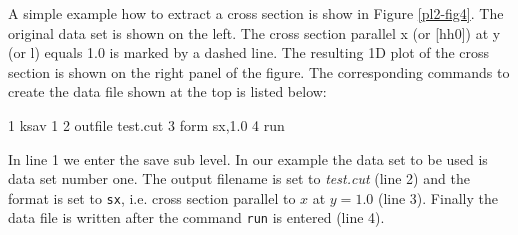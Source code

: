 A simple example how to extract a cross section is show in Figure
\ref{pl2-fig4}. The original data set is shown on the left. The
cross section parallel x (or [hh0]) at y (or l) equals 1.0 is
marked by a dashed line. The resulting 1D plot of the cross
section is shown on the right panel of the figure. The
corresponding commands to create the data file shown at the top is
listed below:

\begin{MacVerbatim}
     1  ksav 1
     2  outfile test.cut
     3  form sx,1.0
     4  run
\end{MacVerbatim}

In line 1 we enter the save sub level. In our example the data set to
be used is data set number one. The output filename is set to {\it
test.cut} (line 2) and the format is set to {\tt sx}, i.e. cross
section parallel to $x$ at $y=1.0$ (line 3). Finally the data file
is written after the command {\tt run} is entered (line 4).


